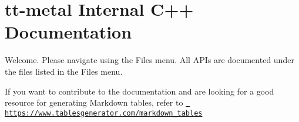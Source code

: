 \chapter{tt-\/metal Internal C++ Documentation}
\hypertarget{index}{}\label{index}
Welcome. Please navigate using the Files menu. All APIs are documented under the files listed in the Files menu.

If you want to contribute to the documentation and are looking for a good resource for generating Markdown tables, refer to \href{https://www.tablesgenerator.com/markdown_tables}{\texttt{ https\+://www.\+tablesgenerator.\+com/markdown\+\_\+tables}} 